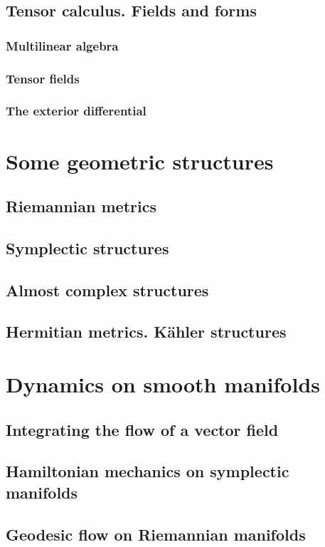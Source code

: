 \documentclass[11pt,a4paper]{book}
\theoremstyle{remark} \newtheorem{rmk}[thm]{Remark}
\theoremstyle{definition} \newtheorem{defn}[thm]{Definition}
\theoremstyle{definition} \newtheorem{ex}[thm]{Example}
\theoremstyle{definition} \newtheorem{ej}[thm]{Exercise}
\begin{document}
\section{Tensor calculus. Fields and forms}
\subsection{Multilinear algebra}
\subsection{Tensor fields}
\subsection{The exterior differential}

\chapter{Some geometric structures}
\section{Riemannian metrics}
\section{Symplectic structures}
\section{Almost complex structures}
\section{Hermitian metrics. Kähler structures}

\chapter{Dynamics on smooth manifolds}
\section{Integrating the flow of a vector field}
\section{Hamiltonian mechanics on symplectic manifolds}
\section{Geodesic flow on Riemannian manifolds}
\end{document}
